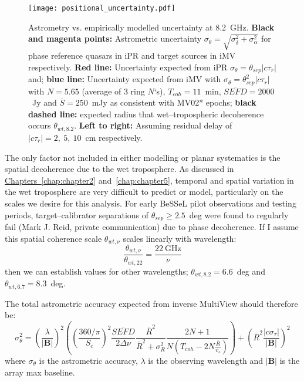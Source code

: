 		\begin{figure}[h]
			\centering\texttt{[image: positional\_uncertainty.pdf]}
			\caption[X--band MultiView Errors]{Astrometry vs. empirically modelled uncertainty at 8.2~GHz. \textbf{Black and magenta points:} Astrometric uncertainty $\sigma_\theta=\sqrt{\sigma_\delta^2+\sigma_\alpha^2}$ for phase reference quasars in iPR and target sources in iMV respectively. \textbf{Red line:} Uncertainty expected from iPR $\sigma_\theta=\theta_{sep}|c\tau_r|$ and; \textbf{blue line:} Uncertainty expected from iMV with $\sigma_\theta=\theta_{sep}^2|c\tau_r|$ with $N=5.65$ (average of 3 ring $N$`s), $T_{coh}=11$~min, $\overline{SEFD}=2000$~Jy and $\overline{S}=250$~mJy as consistent with MV02* epochs; \textbf{black dashed line:} expected radius that wet--tropospheric decoherence occurs $\theta_{wt,8.2}$. \textbf{Left to right:} Assuming residual delay of $|c\tau_r|=2,~5,~10$~cm respectively.} \label{fig:resultsvsmodel}
		\end{figure}
		
		The only factor not included in either modelling or planar systematics is the spatial decoherence due to the wet troposphere. As discussed in \hyperref[chap:chapter2]{Chapters~\ref*{chap:chapter2}} and~\ref{chap:chapter5}, temporal and spatial variation in the wet troposphere are very difficult to predict or model, particularly on the scales we desire for this analysis. For early BeSSeL pilot observations and testing periods, target--calibrator separations of $\theta_{sep}\ge2.5$~deg were found to regularly fail (Mark J. Reid, private communication) due to phase decoherence. If I assume this spatial coherence scale $\theta_{wt,\nu}$ scales linearly with wavelength:
		\begin{equation*}
			\frac{\theta_{wt,\nu}}{\theta_{wt,22}}=\frac{22~\text{GHz}}{\nu}
		\end{equation*} then we can establish values for other wavelengths; $\theta_{wt,8.2}=6.6$~deg and $\theta_{wt,6.7}=8.3$~deg.
		
		The total astrometric accuracy expected from inverse MultiView should therefore be:
		\begin{equation}
			\sigma_\theta^2 = \left(\frac{\lambda}{|\textbf{B}|}\right)^2 \left(\left(\frac{360/\pi}{S_c}\right)^2\frac{\overline{SEFD}}{2\Delta\nu}\frac{\overline{R}^2}{\overline{R}^2+\sigma_R^2}\frac{2N+1}{N\left(T_{coh}-2N\frac{\overline{R}}{v_s}\right)}\right) + \left(\overline{R}^2 \frac{|c\sigma_\tau|}{|\textbf{B}|}\right)^2
			\label{eq:totalmverror}
		\end{equation} where $\sigma_\theta$ is the astrometric accuracy, $\lambda$ is the observing wavelength and $|\textbf{B}|$ is the array max baseline.
			
